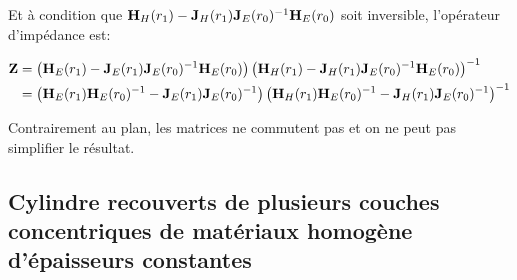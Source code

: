 Et à condition que $\mathbf{H}_{H}(r_1) - \mathbf{J}_{H}(r_1)\mathbf{J}_{E}(r_0)^{-1}\mathbf{H}_{E}(r_0)$ soit inversible, l'opérateur d'impédance est:


\begin{align}
    \mathbf{Z} &= 
    \left(\mathbf{H}_{E}(r_1) - \mathbf{J}_{E}(r_1)\mathbf{J}_{E}(r_0)^{-1}\mathbf{H}_{E}(r_0)\right)
    \left(\mathbf{H}_{H}(r_1) - \mathbf{J}_{H}(r_1)\mathbf{J}_{E}(r_0)^{-1}\mathbf{H}_{E}(r_0)\right)^{-1}
    \\
    &=
    \left(\mathbf{H}_{E}(r_1)\mathbf{H}_{E}(r_0)^{-1} - \mathbf{J}_{E}(r_1)\mathbf{J}_{E}(r_0)^{-1}\right)
    \left(\mathbf{H}_{H}(r_1)\mathbf{H}_{E}(r_0)^{-1} - \mathbf{J}_{H}(r_1)\mathbf{J}_{E}(r_0)^{-1}\right)^{-1}
\end{align}

Contrairement au plan, les matrices  ne commutent pas et on ne peut pas simplifier le résultat.

\subsection{Cylindre recouverts de plusieurs couches concentriques de matériaux homogène d'épaisseurs constantes}